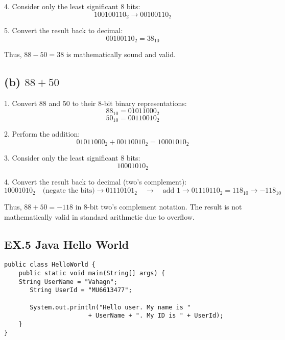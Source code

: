 \documentclass{article}
\begin{document}
4. Consider only the least significant 8 bits:
\[
100100110_2 \rightarrow 00100110_2
\]

5. Convert the result back to decimal:
\[
00100110_2 = 38_{10}
\]

Thus, \(88 - 50 = 38\) is mathematically sound and valid.

\subsection*{(b) \(88 + 50\)}

1. Convert 88 and 50 to their 8-bit binary representations:
\[
88_{10} = 01011000_2
\]
\[
50_{10} = 00110010_2
\]

2. Perform the addition:
\[
01011000_2 + 00110010_2 = 10001010_2
\]

3. Consider only the least significant 8 bits:
\[
10001010_2
\]

4. Convert the result back to decimal (two's complement):
\[
10001010_2 \quad \text{(negate the bits)} \rightarrow 01110101_2 \quad \rightarrow \quad \text{add 1} \rightarrow 01110110_2 = 118_{10} \rightarrow -118_{10}
\]

Thus, \(88 + 50 = -118\) in 8-bit two's complement notation. The result is not mathematically valid in standard arithmetic due to overflow.
\subsection*{EX.5 Java Hello World }

\lstset{language=Java} %
\begin{lstlisting}
public class HelloWorld {
    public static void main(String[] args) {
    String UserName = "Vahagn";
       String UserId = "MU6613477";
        
       System.out.println("Hello user. My name is " 
                       + UserName + ". My ID is " + UserId);
    }
}
\end{lstlisting}
\end{document}
